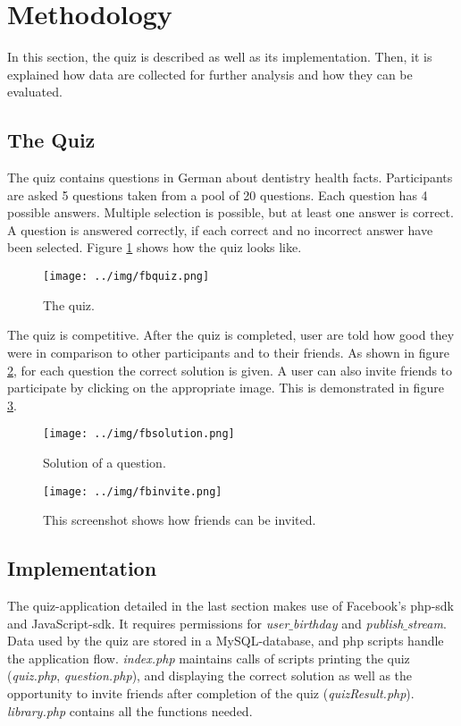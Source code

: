 \documentclass[preprint,12pt]{elsarticle}
\begin{document}
\section{Methodology}
\label{sec:method}
In this section, the quiz is described as well as its
implementation. Then, it is explained how data are collected for
further analysis and how they can be evaluated.

\subsection{The Quiz}
\label{sec:quiz}
The quiz contains questions in German about dentistry health facts. Participants are asked 5
questions taken from a pool of 20 questions. Each question has 4
possible answers. Multiple selection is possible, but at least one
answer is correct. A question is answered correctly, if each correct
and no incorrect answer have been selected. Figure \ref{fig:quiz}
shows how the quiz looks like. 


\begin{figure}
  \texttt{[image: ../img/fbquiz.png]}
 \caption{The quiz.}
\label{fig:quiz}
\end{figure}


The quiz is competitive. After the quiz is completed, user are told
how good they were in comparison to other participants and to their
friends. As shown in figure \ref{fig:solution}, for each question the
correct solution is given. A user can also invite friends to
participate by clicking on the appropriate image. This is demonstrated in
figure \ref{fig:invite}.


\begin{figure}
  \texttt{[image: ../img/fbsolution.png]}
  \caption{Solution of a question.}
\label{fig:solution}
\end{figure}



\begin{figure}
  \texttt{[image: ../img/fbinvite.png]}
  \caption{This screenshot shows how friends can be invited.}
\label{fig:invite}
\end{figure}

\subsection{Implementation}
\label{sec:implementation}
The quiz-application detailed in the last section makes use of
Facebook's php-\ac{sdk} and JavaScript-\ac{sdk}. It requires
permissions for \textit{user$\_$birthday} and
\textit{publish$\_$stream}.
Data used by the quiz are stored in a MySQL-database, and php scripts
handle the application flow. \textit{index.php} maintains calls of
scripts printing the quiz (\textit{quiz.php}, \textit{question.php}), and displaying
the correct solution as well as the opportunity to invite friends
after completion of the quiz
(\textit{quizResult.php}). \textit{library.php} contains all the
functions needed.
\end{document}
